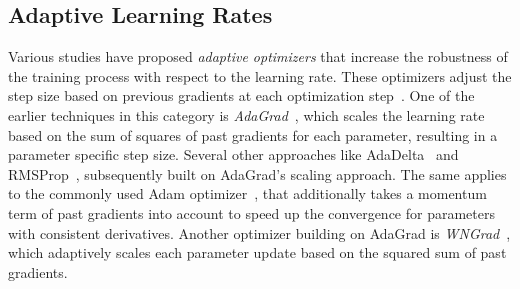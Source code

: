 \documentclass[runningheads]{llncs}
\begin{document}
\subsection{Adaptive Learning Rates}


Various studies have proposed \textit{adaptive optimizers} that increase the robustness of the training process with respect to the learning rate.
These optimizers adjust the step size based on previous gradients at each optimization step~\cite{duchiAdaptiveSubgradientMethods2011}.
One of the earlier techniques in this category is \textit{AdaGrad}~\cite{duchiAdaptiveSubgradientMethods2011}, which scales the learning rate based on the sum of squares of past gradients for each parameter, resulting in a parameter specific step size.
Several other approaches like AdaDelta~\cite{zeilerADADELTAAdaptiveLearning2012a} and RMSProp~\cite{tielemanLecture5rmspropDivide2012}, subsequently built on AdaGrad's scaling approach.
The same applies to the commonly used Adam optimizer~\cite{kingmaAdamMethodStochastic2017b}, that additionally takes a momentum term of past gradients into account to speed up the convergence for parameters with consistent derivatives.
Another optimizer building on AdaGrad is \textit{WNGrad}~\cite{wuWNGradLearnLearning2020}, which adaptively scales each parameter update based on the squared sum of past gradients.
\end{document}
